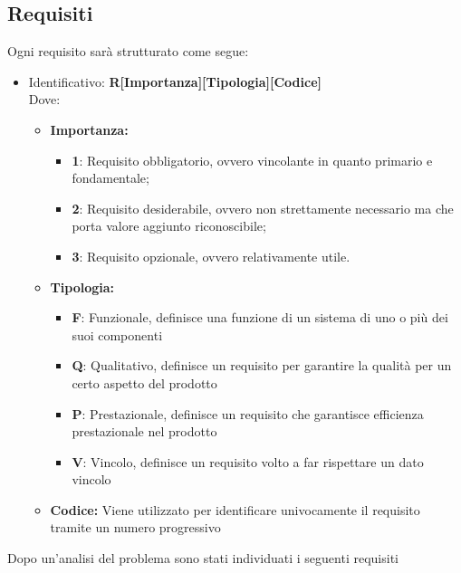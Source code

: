 \subsection{Requisiti}
Ogni requisito sarà strutturato come segue:
\begin{itemize}
	\item Identificativo: \textbf{R[Importanza][Tipologia][Codice]}\\
	Dove:
	\begin{itemize}
		\item \textbf{Importanza:}
		\begin{itemize}
			\item \textbf{1}: Requisito obbligatorio, ovvero vincolante in quanto primario e fondamentale;
			\item \textbf{2}: Requisito desiderabile, ovvero non strettamente necessario ma che porta valore aggiunto riconoscibile;
			\item \textbf{3}: Requisito opzionale, ovvero relativamente utile.
		\end{itemize}
		\item \textbf{Tipologia:}
		\begin{itemize}
			\item \textbf{F}: Funzionale, definisce una funzione di un sistema di uno o più dei suoi componenti
			\item \textbf{Q}: Qualitativo, definisce un requisito per garantire la qualità per un certo aspetto del prodotto
			\item \textbf{P}: Prestazionale, definisce un requisito che garantisce efficienza prestazionale nel prodotto
			\item \textbf{V}: Vincolo, definisce un requisito volto a far rispettare un dato vincolo
		\end{itemize}
		\item \textbf{Codice:} Viene utilizzato per identificare univocamente il requisito tramite un numero progressivo\\
	\end{itemize}
\end{itemize}
Dopo un’analisi del problema sono stati individuati i seguenti requisiti

